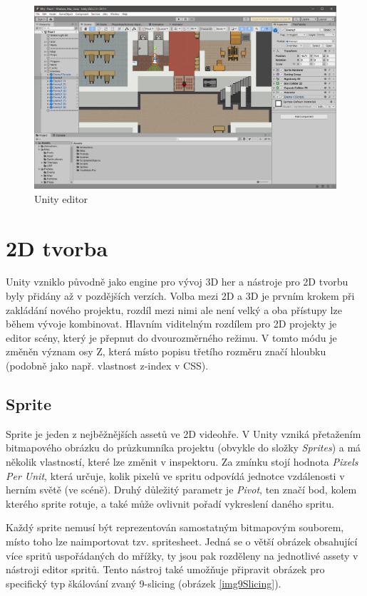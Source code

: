 \documentclass[FM,Proj]{tulthesis}
\begin{document}
	\begin{figure}[ht]
		\centering
		\includegraphics[width=\textwidth]{img/UnityEditor}
		\caption{Unity editor}
	\end{figure}
	
	\section{2D tvorba}
	
	Unity vzniklo původně jako engine pro vývoj 3D her a nástroje pro 2D tvorbu byly přidány až v pozdějších verzích. Volba mezi 2D a 3D je prvním krokem při zakládání nového projektu, rozdíl mezi nimi ale není velký a oba přístupy lze během vývoje kombinovat. Hlavním viditelným rozdílem pro 2D projekty je editor scény, který je přepnut do dvourozměrného režimu. V tomto módu je změněn význam osy Z, která místo popisu třetího rozměru značí hloubku (podobně jako např. vlastnost z-index v CSS). \cite{Unity2DAnnouncement}
	
	\subsection{Sprite} %
	
	Sprite je jeden z nejběžnějších assetů ve 2D videohře. V Unity vzniká přetažením bitmapového obrázku do průzkumníka projektu (obvykle do složky \textit{Sprites}) a má několik vlastností, které lze změnit v inspektoru. Za zmínku stojí hodnota \textit{Pixels Per Unit}, která určuje, kolik pixelů ve spritu odpovídá jednotce vzdálenosti v herním světě (ve scéně). Druhý důležitý parametr je \textit{Pivot}, ten značí bod, kolem kterého sprite rotuje, a také může ovlivnit pořadí vykreslení daného spritu.
	
	Každý sprite nemusí být reprezentován samostatným bitmapovým souborem, místo toho lze naimportovat tzv. spritesheet. Jedná se o větší obrázek obsahující více spritů uspořádaných do mřížky, ty jsou pak rozděleny na jednotlivé assety v nástroji editor spritů. Tento nástroj také umožňuje připravit obrázek pro specifický typ škálování zvaný 9-slicing (obrázek \ref{img9Slicing}).
	
\end{document}
